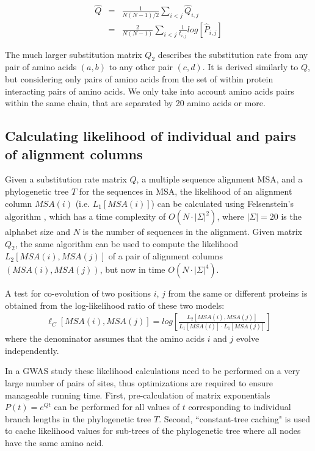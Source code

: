 \begin{eqnarray*}
	\hat{Q} & = & \frac{1}{N(N-1)/2} \sum_{i < j} \hat{Q}_{i,j} \\
	            & =  & \frac{2}{N(N-1)} \sum_{i<j} \frac{1}{t_{i,j}} log[ \hat{P}_{i,j} ]
\end{eqnarray*}

The much larger substitution matrix $Q_2$ describes the substitution rate from any pair of amino acids $(a,b)$ to any other pair $(c,d)$. 
It is derived similarly to $Q$, but considering only pairs of amino acids from the set of within protein interacting pairs of amino acids. 
We only take into account amino acids pairs within the same chain, that are separated by 20 amino acids or more. 

\subsection{Calculating likelihood of individual and pairs of alignment columns}

Given a substitution rate matrix $Q$, a multiple sequence alignment MSA, and a phylogenetic tree $T$ for the sequences in MSA, the likelihood of an alignment column $MSA(i)$ (i.e. $L_1[MSA(i)]$) can be calculated using Felsenstein's algorithm \cite{felsenstein2004inferring}, which has a time complexity of $O(N \cdot |\Sigma|^2)$, where $|\Sigma|=20$ is the alphabet size and $N$ is the number of sequences in the alignment. 
Given matrix $Q_2$, the same algorithm can be used to compute the likelihood $L_2[ MSA(i), MSA(j) ]$ of a pair of alignment columns $( MSA(i), MSA(j) )$, but now in time $O(N \cdot |\Sigma|^4)$. 

A test for co-evolution of two positions $i$, $j$ from the same or different proteins is obtained from the log-likelihood ratio of these two models: 
%
%
\begin{eqnarray}
    \ell_C[MSA(i), MSA(j)] = log \left[ \frac{L_2[ MSA(i), MSA(j) ]}{L_1[MSA(i)] \cdot L_1[MSA(j)]} \right]
\end{eqnarray}
\noindent where the denominator assumes that the amino acids $i$ and $j$ evolve independently. 

In a GWAS study these likelihood calculations need to be performed on a very large number of pairs of sites, thus optimizations are required to ensure manageable running time. 
First, pre-calculation of  matrix exponentials $P(t) = e^{Qt}$ can be performed for all values of $t$ corresponding to individual branch lengths in the phylogenetic tree $T$. 
Second, ``constant-tree caching" is used to cache likelihood values for sub-trees of the phylogenetic tree where all nodes have the same amino acid.

